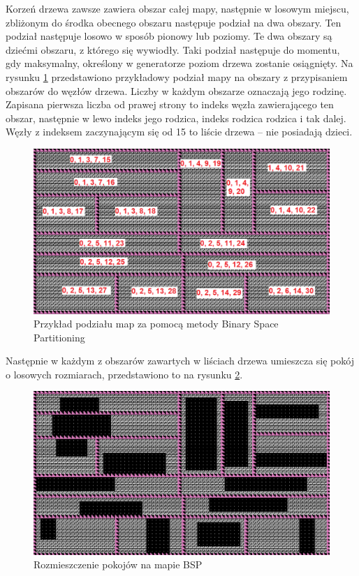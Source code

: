 \documentclass[12pt,twoside]{article}
\begin{document}
Korzeń drzewa zawsze zawiera obszar całej mapy, następnie w losowym miejscu, zbliżonym do środka obecnego obszaru następuje podział na dwa obszary. Ten podział następuje losowo w sposób pionowy lub poziomy. Te dwa obszary są dziećmi obszaru, z którego się wywiodły. Taki podział następuje do momentu, gdy maksymalny, określony w generatorze poziom drzewa zostanie osiągnięty. Na rysunku \ref{generators:bsp_tree} przedstawiono przykładowy podział mapy na obszary z przypisaniem obszarów do węzłów drzewa. Liczby w każdym obszarze oznaczają jego rodzinę. Zapisana pierwsza liczba od prawej strony to indeks węzła zawierającego ten obszar, następnie w lewo indeks jego rodzica, indeks rodzica rodzica i tak dalej. Węzły z indeksem zaczynającym się od 15 to liście drzewa -- nie posiadają dzieci.

\FloatBarrier
\begin{figure}[h]
	\centering
	\includegraphics[width=14cm]{images/generators/bsp_tree.png}
	\caption{Przykład podziału map za pomocą metody Binary Space Partitioning}
	\label{generators:bsp_tree}
\end{figure}
\FloatBarrier

Następnie w każdym z obszarów zawartych w liściach drzewa umieszcza się pokój o losowych rozmiarach, przedstawiono to na rysunku \ref{generators:bsp_rooms}.

\FloatBarrier
\begin{figure}[h]
	\centering
	\includegraphics[width=12cm]{images/generators/bsp_rooms.png}
	\caption{Rozmieszczenie pokojów na mapie BSP}
	\label{generators:bsp_rooms}
\end{figure}
\FloatBarrier
\end{document}
